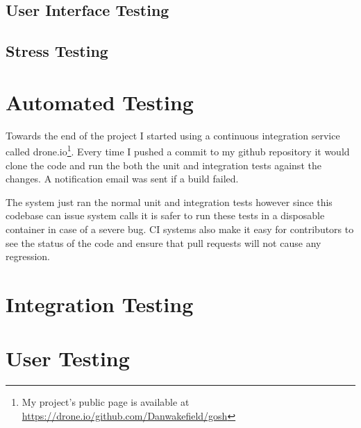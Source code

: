 \subsection{User Interface Testing}

\subsection{Stress Testing}

\section{Automated Testing}
Towards the end of the project I started using a continuous integration service called drone.io\footnote{My project's public page is available at \url{https://drone.io/github.com/Danwakefield/gosh}}.
Every time I pushed a commit to my github repository it would clone the code and run the both the unit and integration tests against the changes.
A notification email was sent if a build failed.

The system just ran the normal unit and integration tests however since this codebase can issue system calls it is safer to run these tests in a disposable container in case of a severe bug.  
CI systems also make it easy for contributors to see the status of the code and ensure that pull requests will not cause any regression.

\section{Integration Testing}

\section{User Testing}